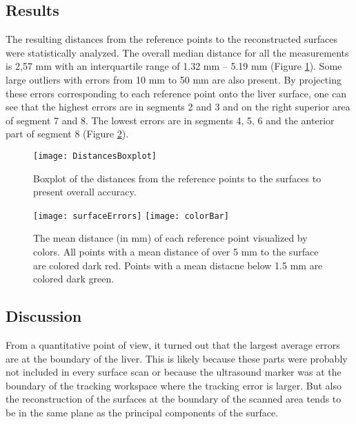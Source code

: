\subsection{Results}
The resulting distances from the reference points to the reconstructed surfaces
were statistically analyzed.
The overall median distance for all the measurements is 2,57 mm with an
interquartile range of 1.32 mm – 5.19 mm (Figure \ref{fig:surfaceDistances}).
Some large outliers with errors from 10 mm to 50 mm are also present. By projecting these errors corresponding to
each reference point onto the liver surface, one can see that the highest errors
are in segments 2 and 3 and on the right superior area of segment 7 and 8. The
lowest errors are in segments 4, 5, 6 and the anterior part of segment 8 (Figure \ref{fig:surfaceErrors}).
\begin{figure}[H]
  \centering
 \texttt{[image: DistancesBoxplot]}
 \caption{Boxplot of the distances from the reference points to the surfaces to present overall accuracy.}
  \label{fig:surfaceDistances}
\end{figure}

\begin{figure}[H]
  \centering
 \texttt{[image: surfaceErrors]}
  \endminipage
  \hfill
 \texttt{[image: colorBar]}
  \endminipage
  \hfill
 \caption{The mean distance (in mm) of each reference point visualized by colors. All
   points with a mean distance of over 5 mm to the surface are colored dark red.
   Points with a mean distacne below 1.5 mm are colored dark green.}
  \label{fig:surfaceErrors}
\end{figure}


\subsection{Discussion}
From a quantitative point of view, it turned out that the largest average errors
are at the boundary of the liver. This is likely because these parts were
probably not included in every surface scan or because the ultrasound marker was
at the boundary of the tracking workspace where the tracking error is larger.
But also the reconstruction of the surfaces at the boundary of the scanned area
tends to be in the same plane as the principal components of the surface.

